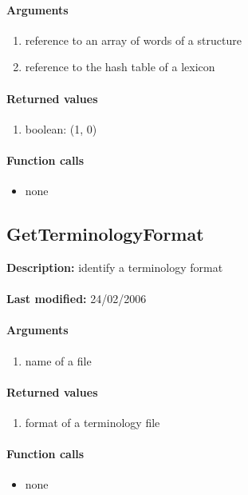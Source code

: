 \paragraph{Arguments}
\begin{enumerate}
\item reference to an array of words of a structure
\item reference to the hash table of a lexicon
\end{enumerate}

\paragraph{Returned values}
\begin{enumerate}
\item boolean: (1, 0)
\end{enumerate}

\paragraph{Function calls}
\begin{itemize}
\item none
\end{itemize}

\subsection{GetTerminologyFormat}
\textbf{Description:} identify a terminology format\\
\\\textbf{Last modified:} 24/02/2006

\paragraph{Arguments}
\begin{enumerate}
\item name of a file
\end{enumerate}

\paragraph{Returned values}
\begin{enumerate}
\item format of a terminology file
\end{enumerate}

\paragraph{Function calls}
\begin{itemize}
\item none
\end{itemize}

